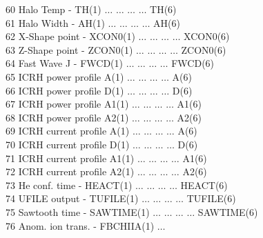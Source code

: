 \begin{tabbing}
\tiny 60 \> \tiny Halo Temp \> - \> \tiny TH(1) \> $\ldots$ \> $\ldots$ \> $\ldots$ \>
$\ldots$ \>\tiny TH(6)\\
\tiny 61 \> \tiny Halo Width \> - \> \tiny AH(1) \> $\ldots$ \> $\ldots$ \> $\ldots$ \>
$\ldots$ \> \tiny AH(6)\\
\tiny 62 \> \tiny X-Shape point \> - \> \tiny XCON0(1) \> $\ldots$ \> $\ldots$ \> $\ldots$ \>
$\ldots$ \> \tiny XCON0(6)\\
\tiny 63 \> \tiny Z-Shape point \> - \> \tiny ZCON0(1) \> $\ldots$ \> $\ldots$ \> $\ldots$ \>
$\ldots$ \> \tiny ZCON0(6)\\
\tiny 64 \> \tiny Fast Wave J \> - \> \tiny FWCD(1) \> $\ldots$ \> $\ldots$ \> $\ldots$ \>
$\ldots$ \> \tiny FWCD(6)\\
\tiny 65 \> \tiny ICRH power profile \>   \> \tiny A(1) \> $\ldots$ \> $\ldots$ \> $\ldots$ \>
$\ldots$ \> \tiny A(6)\\
\tiny 66 \> \tiny ICRH power profile \>   \> \tiny D(1) \> $\ldots$ \> $\ldots$ \> $\ldots$ \>
$\ldots$ \> \tiny D(6)\\
\tiny 67 \> \tiny ICRH power profile \>   \> \tiny A1(1) \> $\ldots$ \> $\ldots$ \> $\ldots$ \>
$\ldots$ \> \tiny A1(6)\\
\tiny 68 \> \tiny ICRH power profile \>   \> \tiny A2(1) \> $\ldots$ \> $\ldots$ \> $\ldots$ \>
$\ldots$ \> \tiny A2(6)\\
\tiny 69 \> \tiny ICRH current profile \>   \> \tiny A(1) \> $\ldots$ \> $\ldots$ \> $\ldots$ \>
$\ldots$ \> \tiny A(6)\\
\tiny 70 \> \tiny ICRH current profile \>   \> \tiny D(1) \> $\ldots$ \> $\ldots$ \> $\ldots$ \>
$\ldots$ \> \tiny D(6)\\
\tiny 71 \> \tiny ICRH current profile \>   \> \tiny A1(1) \> $\ldots$ \> $\ldots$ \> $\ldots$ \>
$\ldots$ \> \tiny A1(6)\\
\tiny 72 \> \tiny ICRH current profile \>   \> \tiny A2(1) \> $\ldots$ \> $\ldots$ \> $\ldots$ \>
$\ldots$ \> \tiny A2(6)\\
\tiny 73 \> \tiny He conf. time \> - \> \tiny HEACT(1) \> $\ldots$ \> $\ldots$ \> $\ldots$ \>
$\ldots$ \> \tiny HEACT(6)\\
\tiny 74 \> \tiny UFILE output \> - \> \tiny TUFILE(1) \> $\ldots$ \> $\ldots$ \> $\ldots$ \>
$\ldots$ \> \tiny TUFILE(6)\\
\tiny 75 \> \tiny Sawtooth time \> - \> \tiny SAWTIME(1) \> $\ldots$ \> $\ldots$ \> $\ldots$ \>
$\ldots$ \> \tiny SAWTIME(6)\\
\tiny 76 \> \tiny Anom. ion trans. \> \tiny  - \>\tiny FBCHIIA(1)  \> $\ldots$ \>

\end{tabbing}
